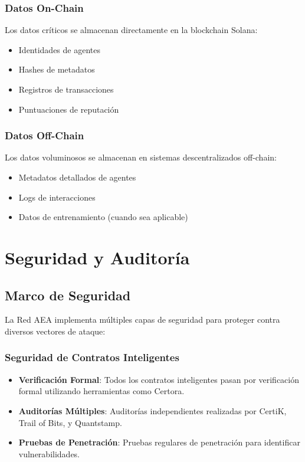 \documentclass[12pt,a4paper]{article}
\begin{document}
\subsubsection{Datos On-Chain}

Los datos críticos se almacenan directamente en la blockchain Solana:
\begin{itemize}
\item Identidades de agentes
\item Hashes de metadatos
\item Registros de transacciones
\item Puntuaciones de reputación
\end{itemize}

\subsubsection{Datos Off-Chain}

Los datos voluminosos se almacenan en sistemas descentralizados off-chain:
\begin{itemize}
\item Metadatos detallados de agentes
\item Logs de interacciones
\item Datos de entrenamiento (cuando sea aplicable)
\end{itemize}

\section{Seguridad y Auditoría}

\subsection{Marco de Seguridad}

La Red AEA implementa múltiples capas de seguridad para proteger contra diversos vectores de ataque:

\subsubsection{Seguridad de Contratos Inteligentes}

\begin{itemize}
\item \textbf{Verificación Formal}: Todos los contratos inteligentes pasan por verificación formal utilizando herramientas como Certora.
\item \textbf{Auditorías Múltiples}: Auditorías independientes realizadas por CertiK, Trail of Bits, y Quantstamp.
\item \textbf{Pruebas de Penetración}: Pruebas regulares de penetración para identificar vulnerabilidades.
\end{itemize}
\end{document}
